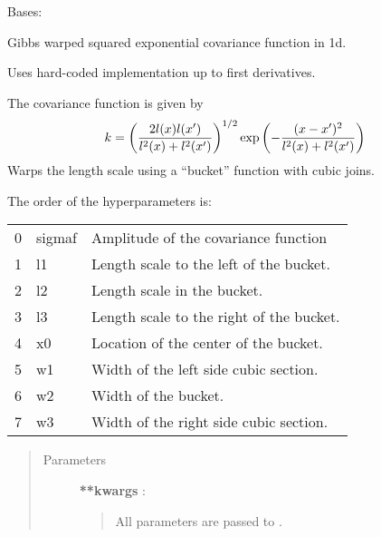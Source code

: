 \documentclass[letterpaper,10pt,english]{sphinxmanual}
\begin{document}

\begin{fulllineitems}
\label{gptools.kernel:gptools.kernel.gibbs.GibbsKernel1dCubicBucket}
Bases: {\hyperref[gptools.kernel:gptools.kernel.gibbs.GibbsKernel1d]{}}

Gibbs warped squared exponential covariance function in 1d.

Uses hard-coded implementation up to first derivatives.

The covariance function is given by
\begin{gather}
\begin{split}k = \left ( \frac{2l(x)l(x')}{l^2(x)+l^2(x')} \right )^{1/2}\exp\left ( -\frac{(x-x')^2}{l^2(x)+l^2(x')} \right )\end{split}\notag
\end{gather}
Warps the length scale using a ``bucket'' function with cubic joins.

The order of the hyperparameters is:

\begin{tabulary}{\linewidth}{|L|L|L|}
\hline

0
 & 
sigmaf
 & 
Amplitude of the covariance function
\\

1
 & 
l1
 & 
Length scale to the left of the bucket.
\\

2
 & 
l2
 & 
Length scale in the bucket.
\\

3
 & 
l3
 & 
Length scale to the right of the bucket.
\\

4
 & 
x0
 & 
Location of the center of the bucket.
\\

5
 & 
w1
 & 
Width of the left side cubic section.
\\

6
 & 
w2
 & 
Width of the bucket.
\\

7
 & 
w3
 & 
Width of the right side cubic section.
\\
\hline\end{tabulary}

\begin{quote}\begin{description}
\item[{Parameters}] \leavevmode
\textbf{**kwargs} :
\begin{quote}

All parameters are passed to {\hyperref[gptools.kernel:gptools.kernel.core.Kernel]{}}.
\end{quote}

\end{description}\end{quote}

\end{fulllineitems}
\end{document}
